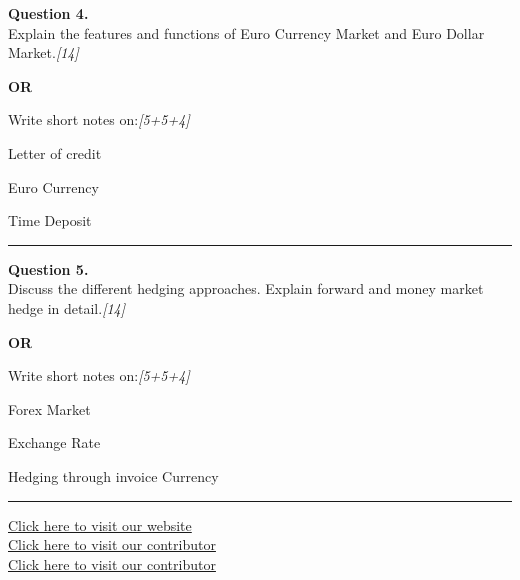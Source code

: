 \documentclass[11pt,a4paper]{article}
\newcommand{\pts}[1]{\hfill   \textit{[#1]}}
\begin{document}
\noindent   \textbf{Question 4.} \\
Explain the features and functions of Euro Currency Market and Euro Dollar Market.\pts{14}

\centerline{   \textbf{OR}}

Write short notes on:\pts{5+5+4}

\begin{parts}
  \item Letter of credit
  \item Euro Currency
  \item Time Deposit
\end{parts}

\medskip\rule{\linewidth}{0.2pt}




\noindent   \textbf{Question 5.} \\
Discuss the different hedging approaches. Explain forward and money market hedge in detail.\pts{14}

\centerline{   \textbf{OR}}

Write short notes on:\pts{5+5+4}

\begin{parts}
  \item Forex Market
  \item Exchange Rate
  \item Hedging through invoice Currency
\end{parts}

\vfill
\rule{\linewidth}{0.4pt}

\begin{center}\small
\href{https://bhu-exam.vercel.app/}{Click here to visit our website}\\[4pt]
\href{https://me-aryan.vercel.app/}{Click here to visit our contributor}\\[4pt]
\href{https://quashan-me.vercel.app/}{Click here to visit our contributor}
\end{center}
\end{document}
